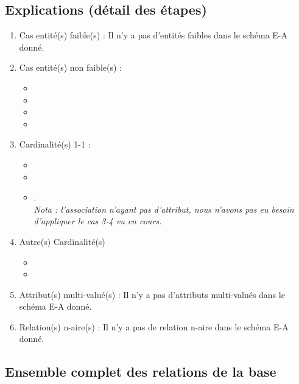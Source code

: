 \documentclass[a4paper,10pt]{report}
\begin{document}
\subsection{Explications (détail des étapes)}

\begin{enumerate}
 \item Cas entité(s) faible(s) :
 Il n'y a pas d'entités faibles dans le schéma E-A donné.
 \item Cas entité(s) non faible(s) :
 	\begin{itemize}
 	\item {}
 	\item {}
 	\item {}
 	\item {}
	\end{itemize}
 \item Cardinalité(s) 1-1 :
 	\begin{itemize}
 	\item {}
 	\item {}
 	\item {}. \\
 	\textit{Nota : l'association  n'ayant pas d'attribut, nous n'avons pas eu besoin d'appliquer le cas 3-4 vu en cours.}
	\end{itemize}
 \item Autre(s) Cardinalité(s) 
 \begin{itemize}
 	\item {}
 	\item {}
	\end{itemize}
 \item Attribut(s) multi-valué(s) :
 Il n'y a pas d'attributs multi-valués dans le schéma E-A donné.
 \item Relation(s) n-aire(s) :
Il n'y a pas de relation n-aire dans le schéma E-A donné.
\end{enumerate}


\subsection{Ensemble complet des relations de la base}
\end{document}
